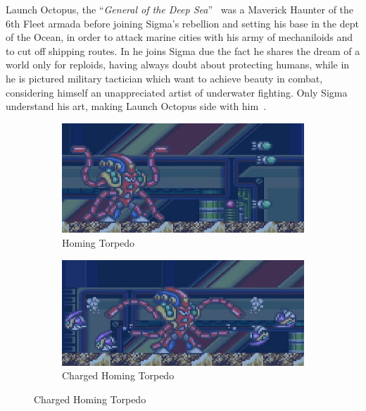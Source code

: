 Launch Octopus, the ``\textit{General of the Deep Sea}''~\cite{book:MMX_Complete_art} was a Maverick Haunter of the 6th Fleet armada before joining Sigma's rebellion and setting his base in the dept of the Ocean, in order to attack marine cities with his army of mechaniloids and to cut off shipping routes. In \x he joins Sigma due the fact he shares the dream of a world only for reploids, having always doubt about protecting humans, while in \mhx he is pictured military tactician which want to achieve beauty in combat, considering himself an unappreciated artist of underwater fighting. Only Sigma understand his art, making Launch Octopus side with him~\cite{wiki:MM_MHX_script}.

\begin{figure}[htp]
	\centering
	\begin{subfigure}{0.48\textwidth}
		\centering
		\includegraphics[width=\linewidth]{figures/X1/Launch_octopus/Octopus_missile.jpg}
		\caption{Homing Torpedo}
	\end{subfigure}
	\begin{subfigure}{0.49\textwidth}
		\centering
		\includegraphics[width=\linewidth]{figures/X1/Launch_octopus/Octopus_piranha.jpg}
		\caption{Charged Homing Torpedo}
	\end{subfigure}
\end{figure}

